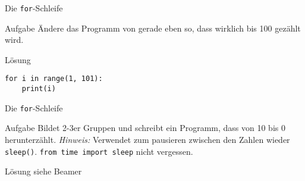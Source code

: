 \begin{frame}[fragile]{Die \texttt{for}-Schleife}
\begin{block}{Aufgabe}
Ändere das Programm von gerade eben so, dass wirklich bis 100 gezählt wird.
\end{block}
\pause{}
\begin{exampleblock}{Lösung}
\begin{lstlisting}
for i in range(1, 101):
    print(i)
\end{lstlisting}
\end{exampleblock}
\end{frame}

\begin{frame}[fragile]{Die \texttt{for}-Schleife}
\begin{block}{Aufgabe}
Bildet 2-3er Gruppen und schreibt ein Programm, dass von 10 bis 0 herunterzählt.
\textit{Hinweis:} Verwendet zum pausieren zwischen den Zahlen wieder \texttt{sleep()}.
\lstinline{from time import sleep} nicht vergessen.
\end{block}
\pause{}
\begin{exampleblock}{Lösung}
    siehe Beamer
\end{exampleblock}
\end{frame}

